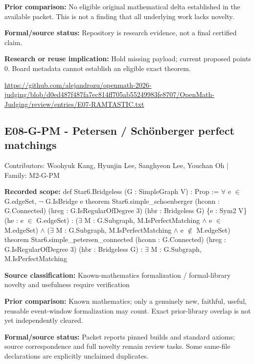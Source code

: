 \documentclass[11pt,a4paper]{article}
\begin{document}
\textbf{Prior comparison:} No eligible original mathematical delta established in the available packet. This is not a finding that all underlying work lacks novelty.

\textbf{Formal/source status:} Repository is research evidence, not a final certified claim.

\textbf{Research or reuse implication:} Hold missing payload; current proposed points 0. Board metadata cannot establish an eligible exact theorem.

{\small \url{https://github.com/alejandrozu/openmath-2026-judging/blob/d0ed487f487fa7ec814ff705ab55249983fe8707/OpenMath-Judging/review/entries/E07-RAMTASTIC.txt}\par}

\begin{samepage}
\subsection{E08-G-PM  -  Petersen / Schönberger perfect matchings}
{\small Contributors: Woohyuk Kang, Hyunjin Lee, Sanghyeon Lee, Youchan Oh | Family: M2-G-PM\par}

\textbf{Recorded scope:} def Star6.Bridgeless (G : SimpleGraph V) : Prop := \ensuremath{\forall} e \ensuremath{\in} G.edgeSet, \ensuremath{\neg} G.IsBridge e
theorem Star6.simple\_schoenberger (hconn : G.Connected) (hreg : G.IsRegularOfDegree 3) (hbr : Bridgeless G)
    \{e : Sym2 V\} (he : e \ensuremath{\in} G.edgeSet) :
    (\ensuremath{\exists} M : G.Subgraph, M.IsPerfectMatching \ensuremath{\wedge} e \ensuremath{\in} M.edgeSet) \ensuremath{\wedge} (\ensuremath{\exists} M : G.Subgraph, M.IsPerfectMatching \ensuremath{\wedge} e \ensuremath{\notin} M.edgeSet)
theorem Star6.simple\_petersen\_connected (hconn : G.Connected) (hreg : G.IsRegularOfDegree 3) (hbr : Bridgeless G) :
    \ensuremath{\exists} M : G.Subgraph, M.IsPerfectMatching


\end{samepage}
\textbf{Source classification:} Known-mathematics formalization / formal-library novelty and usefulness require verification

\textbf{Prior comparison:} Known mathematics; only a genuinely new, faithful, useful, reusable event-window formalization may count. Exact prior-library overlap is not yet independently cleared.

\textbf{Formal/source status:} Packet reports pinned builds and standard axioms; source correspondence and full novelty remain review tasks. Some same-file declarations are explicitly unclaimed duplicates.
\end{document}
